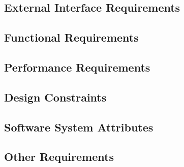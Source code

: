 \documentclass[a4paper,12pt]{article}
\begin{document}
\subsection{External Interface Requirements}

\subsection{Functional Requirements}

\subsection{Performance Requirements}

\subsection{Design Constraints}

\subsection{Software System Attributes}

\subsection{Other Requirements}

\newpage
\clearpage
{}
\end{document}
